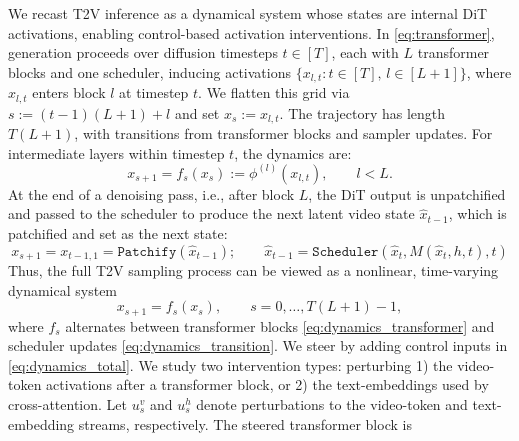 \documentclass{article}
\begin{document}
 We recast T2V inference as a dynamical system whose states are internal
DiT activations, enabling control-based activation interventions. In
\eqref{eq:transformer}, generation proceeds over diffusion timesteps
$t\in[T]$, each with $L$ transformer blocks and one scheduler, inducing activations
$\{x_{l,t}:t\in[T],\,l\in[L+1]\}$, where $x_{l,t}$ enters block $l$ at
timestep $t$. We flatten this grid via $s:=(t-1)(L+1)+l$ and set
$x_s:=x_{l,t}$. The trajectory has length $T(L+1)$, with transitions
from transformer blocks and sampler updates. For intermediate layers
within timestep $t$, the dynamics are: 
\begin{equation}\label{eq:dynamics_transformer}
    x_{s+1}
    =
    f_s(x_s)
    :=
    \phi^{(l)}(x_{l,t}),
    \qquad l < L.
\end{equation}
At the end of a denoising pass, i.e., after block $L$, the DiT output is unpatchified and passed to the scheduler to produce the next latent video state $\hat x_{t-1}$, which is patchified and set as the next state: 
\begin{equation}\label{eq:dynamics_transition}
    x_{s+1}
    =
    x_{t-1, 1}
    =
    \texttt{Patchify}(\hat x_{t-1}); \qquad \hat x_{t-1}
    =
    \texttt{Scheduler}
    \left(
        \hat x_t,
        M(\hat x_t,h,t),
        t
    \right)
\end{equation}
Thus, the full T2V sampling process can be viewed as a nonlinear, time-varying dynamical system
\begin{equation}\label{eq:dynamics_total}
    x_{s+1} = f_s(x_s),
    \qquad s = 0,\ldots,T(L+1)-1,
\end{equation}
where $f_s$ alternates between transformer blocks \eqref{eq:dynamics_transformer} and scheduler updates \eqref{eq:dynamics_transition}.
We steer by adding control inputs in \eqref{eq:dynamics_total}. We study two intervention types: perturbing 1) the video-token activations after a transformer block, or 2) the text-embeddings used by cross-attention. Let $u_s^v$ and $u_s^h$ denote perturbations to the video-token and text-embedding streams, respectively. The steered transformer block is
\end{document}
